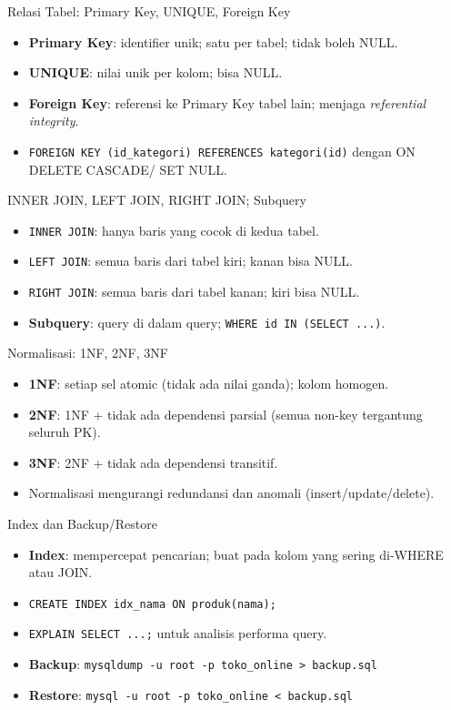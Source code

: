\documentclass[handout]{beamer}
\begin{document}
\begin{frame}{Relasi Tabel: Primary Key, UNIQUE, Foreign Key}
	\begin{itemize}
		\item \textbf{Primary Key}: identifier unik; satu per tabel; tidak boleh NULL.
		\item \textbf{UNIQUE}: nilai unik per kolom; bisa NULL.
		\item \textbf{Foreign Key}: referensi ke Primary Key tabel lain; menjaga \textit{referential integrity}.
		\item \texttt{FOREIGN KEY (id\_kategori) REFERENCES kategori(id)} dengan ON DELETE CASCADE/ SET NULL.
	\end{itemize}
\end{frame}

\begin{frame}{INNER JOIN, LEFT JOIN, RIGHT JOIN; Subquery}
	\begin{itemize}
		\item \texttt{INNER JOIN}: hanya baris yang cocok di kedua tabel.
		\item \texttt{LEFT JOIN}: semua baris dari tabel kiri; kanan bisa NULL.
		\item \texttt{RIGHT JOIN}: semua baris dari tabel kanan; kiri bisa NULL.
		\item \textbf{Subquery}: query di dalam query; \texttt{WHERE id IN (SELECT ...)}.
	\end{itemize}
\end{frame}

\begin{frame}{Normalisasi: 1NF, 2NF, 3NF}
	\begin{itemize}
		\item \textbf{1NF}: setiap sel atomic (tidak ada nilai ganda); kolom homogen.
		\item \textbf{2NF}: 1NF + tidak ada dependensi parsial (semua non-key tergantung seluruh PK).
		\item \textbf{3NF}: 2NF + tidak ada dependensi transitif.
		\item Normalisasi mengurangi redundansi dan anomali (insert/update/delete).
	\end{itemize}
\end{frame}

\begin{frame}{Index dan Backup/Restore}
	\begin{itemize}
		\item \textbf{Index}: mempercepat pencarian; buat pada kolom yang sering di-WHERE atau JOIN.
		\item \texttt{CREATE INDEX idx\_nama ON produk(nama);}
		\item \texttt{EXPLAIN SELECT ...;} untuk analisis performa query.
		\item \textbf{Backup}: \texttt{mysqldump -u root -p toko\_online > backup.sql}
		\item \textbf{Restore}: \texttt{mysql -u root -p toko\_online < backup.sql}
	\end{itemize}
\end{frame}
\end{document}
